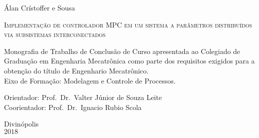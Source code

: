 \begin{center}
    \large Álan Crístoffer e Sousa
\end{center}

\vspace*{1.5cm}

\begin{center}
    \Large{\textsc{Implementação de controlador MPC em um sistema a parâmetros
                  distribuídos via subsistemas interconectados}} %
\end{center}

\vspace*{1.5cm}

\begin{flushright}
    \begin{minipage}{9.0cm}
        Monografia de Trabalho de Conclusão de Curso apresentada ao Colegiado de
        Graduação em Engenharia Mecatrônica como  parte dos requisitos exigidos
        para a obtenção do título de Engenhario Mecatrônico.\\
        Eixo de Formação: Modelagem e Controle de Processos.

        \vspace*{1cm}

        Orientador: Prof.\ Dr.\ Valter Júnior de Souza Leite\\
        Coorientador: Prof.\ Dr.\ Ignacio Rubio Scola
    \end{minipage}
\end{flushright}

\vspace*{1cm}

\columnwidth{}
\centerline{} %

\null\vfill

\begin{center}
    Divinópolis\\
    \(2018\) %
\end{center}

\cleardoublepage{}


\cleardoublepage{}


\cleardoublepage{}
